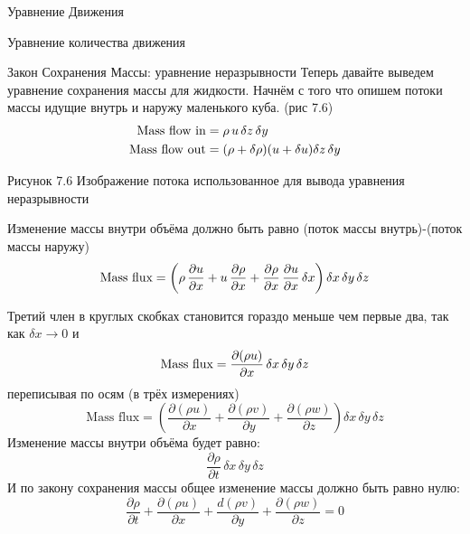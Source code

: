 \begin{chapter}{Уравнение Движения}
\begin{section}{Уравнение количества движения}
\end{section}

\begin{section}{Закон Сохранения Массы: уравнение неразрывности}
Теперь давайте выведем уравнение сохранения массы для жидкости. Начнём
с того что опишем потоки массы идущие внутрь и наружу маленького
куба. (рис 7.6)
\begin{align}
\text{Mass flow in} &= \rho \, u \, \delta z \, \delta y \notag  \\
\text{Mass flow out} &= (\rho + \delta \rho ) (u + \delta u) \delta z \,  \delta y \notag
\end{align}

Рисунок 7.6 Изображение потока использованное для вывода уравнения
неразрывности

Изменение массы внутри объёма должно быть равно (поток массы
внутрь)-(поток массы наружу)
\begin{equation}
\text{Mass flux} = \left(\rho \, \frac{\partial{u}}{\partial{x}} + u\,\frac{\partial{\rho}}{\partial{x}}
+\frac{\partial{\rho}}{\partial{x}}\,\frac{\partial{u}}{\partial{x}}\,\delta{x}\right)\delta{x}\,\delta{y}\,\delta{z}
\notag
\end{equation}

Третий член в круглых скобках становится гораздо меньше чем первые
два, так как $\delta x \rightarrow 0$ и
\begin{equation}
\text{Mass flux} =
\frac{\partial{(\rho{u})}}{\partial{x}}\,\delta{x}\,\delta{y}\,\delta{z} \notag
\end{equation}
переписывая по осям (в трёх измерениях)
\begin{displaymath}
\mbox{Mass flux} = \left(\frac{\partial{(\rho{u})}}{\partial{x}} +
\frac{\partial{(\rho{v})}}{\partial{y}} +
\frac{\partial{(\rho{w})}}{\partial{z}}\right)\delta{x}\,\delta{y}\,\delta{z}
\end{displaymath}
Изменение массы внутри объёма будет равно:
\begin{displaymath}
\frac{\partial\rho}{\partial{t}}\,\delta{x}\,\delta{y}\,\delta{z}
\end{displaymath}
И по закону сохранения массы общее изменение массы должно быть равно нулю:
\begin{equation}
\frac{\partial\rho}{\partial{t}} + \frac{\partial{(\rho{u})}}{\partial{x}} + \frac{d(\rho{v})}{\partial{y}} + \frac{\partial{(\rho{w})}}{\partial{z}} = 0
\end{equation}


\end{section}
\end{chapter}
